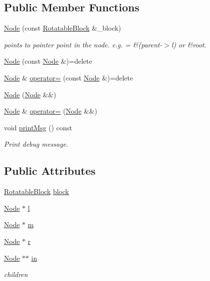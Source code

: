 \subsection*{Public Member Functions}
\begin{DoxyCompactItemize}
\item 
\hyperlink{structTTree_1_1Node_acd5412e99e3b645fafd222e15388277b}{Node} (const \hyperlink{structRotatableBlock}{Rotatable\+Block} \&\+\_\+block)
\begin{DoxyCompactList}\small\item\em points to pointer point in the node. e.\+g. = \&(parent-\/$>$l) or \&root. \end{DoxyCompactList}\item 
\hyperlink{structTTree_1_1Node_a6b9ce78ca08f3648379cf135d6796092}{Node} (const \hyperlink{structTTree_1_1Node}{Node} \&)=delete
\item 
\hyperlink{structTTree_1_1Node}{Node} \& \hyperlink{structTTree_1_1Node_a20ffdb80255bcabcdff42201b961869e}{operator=} (const \hyperlink{structTTree_1_1Node}{Node} \&)=delete
\item 
\hyperlink{structTTree_1_1Node_a78c5f48ae1323abc4b9186f1b7e89dd1}{Node} (\hyperlink{structTTree_1_1Node}{Node} \&\&)
\item 
\hyperlink{structTTree_1_1Node}{Node} \& \hyperlink{structTTree_1_1Node_aa3c96d0cacc8d285aee7290a257077b1}{operator=} (\hyperlink{structTTree_1_1Node}{Node} \&\&)
\item 
void \hyperlink{structTTree_1_1Node_a6d989c4974f820a288dcf18cad3e8ed1}{print\+Msg} () const 
\begin{DoxyCompactList}\small\item\em Print debug message. \end{DoxyCompactList}\end{DoxyCompactItemize}
\subsection*{Public Attributes}
\begin{DoxyCompactItemize}
\item 
\hyperlink{structRotatableBlock}{Rotatable\+Block} \hyperlink{structTTree_1_1Node_a100664635a89fa354373102768bd22be}{block}
\item 
\hyperlink{structTTree_1_1Node}{Node} $\ast$ \hyperlink{structTTree_1_1Node_a78f1bf067928d0e0106e1187364cc69e}{l}
\item 
\hyperlink{structTTree_1_1Node}{Node} $\ast$ \hyperlink{structTTree_1_1Node_a3f47f1068b4631b1d9eddea0300c6bee}{m}
\item 
\hyperlink{structTTree_1_1Node}{Node} $\ast$ \hyperlink{structTTree_1_1Node_adb67ed846e6787b3ff26bbcee11ee4b6}{r}
\item 
\hyperlink{structTTree_1_1Node}{Node} $\ast$$\ast$ \hyperlink{structTTree_1_1Node_ab126c67191b7e91a1eccc18a3eeadf0b}{in}
\begin{DoxyCompactList}\small\item\em children \end{DoxyCompactList}\end{DoxyCompactItemize}


